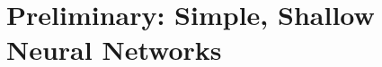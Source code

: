 \documentclass{now}
\newcommand{\alert}[1]{\textcolor{red}{#1}}
\newcommand{\citepub}[1]{\alert{#1}}
\begin{document}














\chapter{Preliminary: Simple, Shallow Neural Networks}
\label{chapter:simple_neural_networks}
\end{document}
